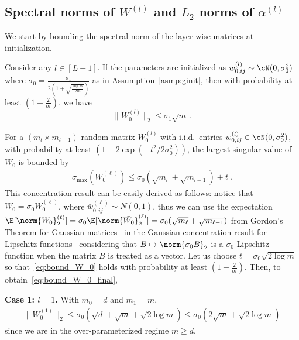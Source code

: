 \subsection{Spectral norms of $W^{(l)}$ and $L_2$ norms of $\alpha^{(l)}$}
We start by bounding the spectral norm of the layer-wise matrices at initialization.
\begin{lemm}
Consider any $l\in[L+1]$. If the parameters are initialized as $w_{0,ij}^{(l)} \sim \cN(0,\sigma_0^2)$ where $\sigma_0 = \frac{\sigma_1}{2(1 + \sqrt{\frac{\log m}{2m}})}$ as in Assumption~\ref{asmp:ginit}, then with probability at least $\left(1 - \frac{2}{m} \right)$, we have
\begin{equation}
\label{eq:bound_W_0_final}
    \| W_0^{(l)} \|_2 \leq \sigma_1 \sqrt{m}  ~.
\end{equation}
\label{lem:aux1}
\end{lemm}
\proof For a $(m_l \times m_{l-1})$ random matrix $W_0^{(l)}$ with i.i.d.~entries $w_{0,ij}^{(l)} \in \cN(0,\sigma_0^2)$, with probability at least $(1 - 2\exp(-t^2/2\sigma_0^2))$, the largest singular value of $W_{0}$ is bounded by
\begin{align}
\label{eq:bound_W_0}
    \sigma_{\max}(W_{0}^{(\ell)}) \leq \sigma_0(\sqrt{m_l} + \sqrt{m_{l-1}}) + t~.
\end{align}
This concentration result can be easily derived as follows: notice that $W_0=\sigma_0 \bar{W}_0^{(\ell)}$, where $\bar{w}_{0,ij}^{(\ell)}\sim N(0,1)$, thus we can use the expectation  $\E[\norm{W_0}_2^{(\ell)}]=\sigma_0\E[\norm{\bar{W_0}}_2^{(\ell)}]=\sigma_0(\sqrt{m_\ell}+\sqrt{m_{\ell-1}})$ from Gordon's Theorem for Gaussian matrices~\cite[Theorem~5.32]{RV:12} in the Gaussian concentration result for Lipschitz functions~\cite[Proposition~3.4]{RV:12} considering that $B\mapsto\norm{\sigma_0 B}_2$ is a $\sigma_0$-Lipschitz function when the matrix $B$ is treated as a vector. Let us choose $t=\sigma_0 \sqrt{2\log m}$ so that~\eqref{eq:bound_W_0} holds with probability at least $(1-\frac{2}{m})$. Then, to obtain~\eqref{eq:bound_W_0_final},

\textbf{Case 1: $l=1$.}
With $m_0=d$ and $m_1 = m$,  
\begin{align*}
    \| W_{0}^{(1)} \|_2 \leq \sigma_0( \sqrt{d} + \sqrt{m} + \sqrt{2\log m})\leq \sigma_0(2 \sqrt{m} + \sqrt{2\log m})
\end{align*}
since we are in the over-parameterized regime $m\geq d$.

